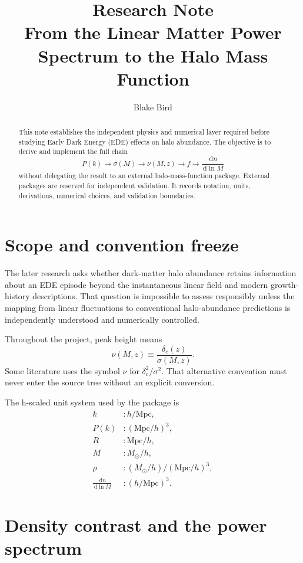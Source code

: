 \documentclass[11pt]{article}
\title{Research Note\\\large From the Linear Matter Power Spectrum to the Halo Mass Function}
\author{Blake Bird}
\date{}
\newcommand{\dd}{\,\mathrm d}
\newcommand{\Mpc}{\mathrm{Mpc}}
\newcommand{\Msun}{M_\odot}
\begin{document}
\maketitle

\begin{abstract}
This note establishes the independent physics and numerical layer required before studying Early Dark Energy (EDE) effects on halo abundance. The objective is to derive and implement the full chain
\[
P(k)\longrightarrow \sigma(M)\longrightarrow \nu(M,z)\longrightarrow f\longrightarrow \frac{\dd n}{\dd\ln M}
\]
without delegating the result to an external halo-mass-function package. External packages are reserved for independent validation. It records notation, units, derivations, numerical choices, and validation boundaries.
\end{abstract}

\section{Scope and convention freeze}

The later research asks whether dark-matter halo abundance retains information about an EDE episode \cite{PoulinEtAl2019,KamionkowskiRiess2023} beyond the instantaneous linear field and modern growth-history descriptions. That question is impossible to assess responsibly unless the mapping from linear fluctuations to conventional halo-abundance predictions is independently understood and numerically controlled.


Throughout the project, peak height means
\begin{equation}
\boxed{\nu(M,z)\equiv \frac{\delta_c(z)}{\sigma(M,z)}}.
\end{equation}
Some literature uses the symbol $\nu$ for $\delta_c^2/\sigma^2$. That alternative convention must never enter the source tree without an explicit conversion.

The h-scaled unit system used by the package is
\begin{align}
k &: h/\Mpc,\\
P(k) &: (\Mpc/h)^3,\\
R &: \Mpc/h,\\
M &: \Msun/h,\\
\rho &: (\Msun/h)/(\Mpc/h)^3,\\
\frac{\dd n}{\dd\ln M} &: (h/\Mpc)^3.
\end{align}

\section{Density contrast and the power spectrum}
\end{document}
